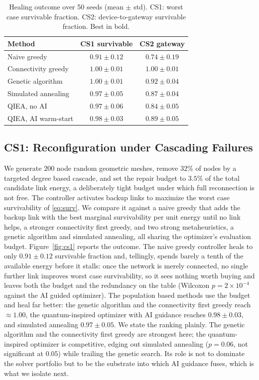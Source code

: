 \documentclass[journal]{IEEEtran}
\begin{document}
\begin{table}[t]
\caption{Healing outcome over 50 seeds (mean $\pm$ std). CS1: worst case survivable fraction. CS2: device-to-gateway survivable fraction. Best in bold.}
\label{tab:results}
\centering
\renewcommand{\arraystretch}{1.2}
\begin{tabular}{l c c}
\toprule
\textbf{Method} & \textbf{CS1 survivable} & \textbf{CS2 gateway} \\
\midrule
Naive greedy        & $0.91 \pm 0.12$ & $0.74 \pm 0.19$ \\
Connectivity greedy & $\mathbf{1.00 \pm 0.01}$ & $\mathbf{1.00 \pm 0.01}$ \\
Genetic algorithm   & $\mathbf{1.00 \pm 0.01}$ & $0.92 \pm 0.04$ \\
Simulated annealing & $0.97 \pm 0.05$ & $0.87 \pm 0.04$ \\
QIEA, no AI         & $0.97 \pm 0.06$ & $0.84 \pm 0.05$ \\
QIEA, AI warm-start & $0.98 \pm 0.03$ & $0.89 \pm 0.05$ \\
\bottomrule
\end{tabular}
\end{table}

\subsection{CS1: Reconfiguration under Cascading Failures}
We generate $200$ node random geometric meshes, remove $32\%$ of nodes by a targeted degree based cascade, and set the repair budget to $3.5\%$ of the total candidate link energy, a deliberately tight budget under which full reconnection is not free. The controller activates backup links to maximize the worst case survivability of \eqref{eq:surv}. We compare it against a naive greedy that adds the backup link with the best marginal survivability per unit energy until no link helps, a stronger connectivity first greedy, and two strong metaheuristics, a genetic algorithm and simulated annealing, all sharing the optimizer's evaluation budget. Figure~\ref{fig:cs1} reports the outcome. The naive greedy controller heals to only $0.91\pm0.12$ survivable fraction and, tellingly, spends barely a tenth of the available energy before it stalls: once the network is merely connected, no single further link improves worst case survivability, so it sees nothing worth buying and leaves both the budget and the redundancy on the table (Wilcoxon $p=2\times10^{-4}$ against the AI guided optimizer). The population based methods use the budget and heal far better: the genetic algorithm and the connectivity first greedy reach $\approx 1.00$, the quantum-inspired optimizer with AI guidance reaches $0.98\pm0.03$, and simulated annealing $0.97\pm0.05$. We state the ranking plainly. The genetic algorithm and the connectivity first greedy are strongest here; the quantum-inspired optimizer is competitive, edging out simulated annealing ($p=0.06$, not significant at $0.05$) while trailing the genetic search. Its role is not to dominate the solver portfolio but to be the substrate into which AI guidance fuses, which is what we isolate next.
\end{document}
